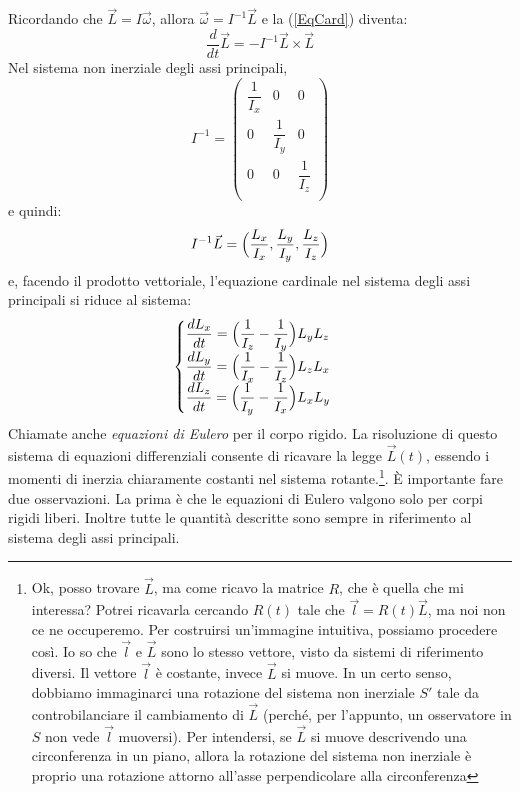 \documentclass[a4paper,openany]{article}
\begin{document}
	
	Ricordando che $\vec{L} = I\vec{\omega}$, allora $\vec{\omega} = I^{-1}\vec{L}$ e la (\ref{EqCard}) diventa:
	\begin{equation}
		\dfrac{d}{dt}\vec{L} = -I^{-1}\vec{L}\times\vec{L}
		\label{EqCard}
	\end{equation}
	Nel sistema non inerziale degli assi principali,
	\begin{equation}\label{key}
		I^{-1} = 
		\begin{pmatrix}
			\dfrac{1}{I_{x}} & 0 & 0 \\
			0 & \dfrac{1}{I_y} & 0 \\
			0 & 0 & \dfrac{1}{I_z} \\
		\end{pmatrix}
	\end{equation}
e quindi:
\begin{equation}\label{key}
	I^{-1}\vec{L} = \Bigl(\dfrac{L_x}{I_x},\dfrac{L_y}{I_y},\dfrac{L_z}{I_z}\Bigl)
\end{equation}
	e, facendo il prodotto vettoriale, l'equazione cardinale nel sistema degli assi principali si riduce al sistema:
	\begin{equation}
		\begin{cases}
			\dfrac{dL_x}{dt} = \Bigl(\dfrac{1}{I_z}-\dfrac{1}{I_y}\Bigl) L_yL_z \\
			\dfrac{dL_y}{dt} = \Bigl(\dfrac{1}{I_x}-\dfrac{1}{I_z}\Bigl) L_zL_x \\
			\dfrac{dL_z}{dt} = \Bigl(\dfrac{1}{I_y}-\dfrac{1}{I_x}\Bigl) L_xL_y
		\end{cases}
		\label{EqEulero}
	\end{equation}
	Chiamate anche \textit{equazioni di Eulero} per il corpo rigido. La risoluzione di questo sistema di equazioni differenziali consente di ricavare la legge $\vec{L}(t)$, essendo i momenti di inerzia chiaramente costanti nel sistema rotante.\footnote{Ok, posso trovare $\vec{L}$, ma come ricavo la matrice $R$, che è quella che mi interessa? Potrei ricavarla cercando $R(t)$ tale che $\vec{l} = R(t)\vec{L}$, ma noi non ce ne occuperemo. Per costruirsi un'immagine intuitiva, possiamo procedere così. Io so che $\vec{l}$ e $\vec{L}$ sono lo stesso vettore, visto da sistemi di riferimento diversi. Il vettore $\vec{l}$ è costante, invece $\vec{L}$ si muove. In un certo senso, dobbiamo immaginarci una rotazione del sistema non inerziale $S'$ tale da controbilanciare il cambiamento di $\vec{L}$ (perché, per l'appunto, un osservatore in $S$ non vede $\vec{l}$ muoversi). Per intendersi, se $\vec{L}$ si muove descrivendo una circonferenza in un piano, allora la rotazione del sistema non inerziale è proprio una rotazione attorno all'asse perpendicolare alla circonferenza}. È importante fare due osservazioni. La prima è che le equazioni di Eulero valgono solo per corpi rigidi liberi. Inoltre tutte le quantità descritte sono sempre in riferimento al sistema degli assi principali.
\end{document}
